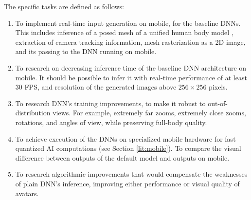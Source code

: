 The specific tasks are defined as follows:
\begin{enumerate}
	\item To implement real-time input generation on mobile, for the baseline DNNs. This includes inference of a posed mesh of a unified human body model \cite{dnn:smplx19}, extraction of camera tracking information, mesh rasterization as a 2D image, and its passing to the DNN running on mobile.
	\item To research on decreasing inference time of the baseline \cite{dnn:stylepeople21} DNN architecture on mobile. It should be possible to infer it with real-time performance of at least 30 FPS, and resolution of the generated images above $256\times256$ pixels.
	\item To research DNN's training improvements, to make it robust to out-of-distribution views. For example, extremely far zooms, extremely close zooms, rotations, and angles of view, while preserving full-body quality.
	\item To achieve execution of the DNNs on specialized mobile hardware for fast quantized AI computations (see Section \ref{lit:mobile}). To compare the visual difference between outputs of the default model and outputs on mobile.
	\item To research algorithmic improvements that would compensate the weaknesses of plain DNN's inference, improving either performance or visual quality of avatars.

\end{enumerate}

\newpage


